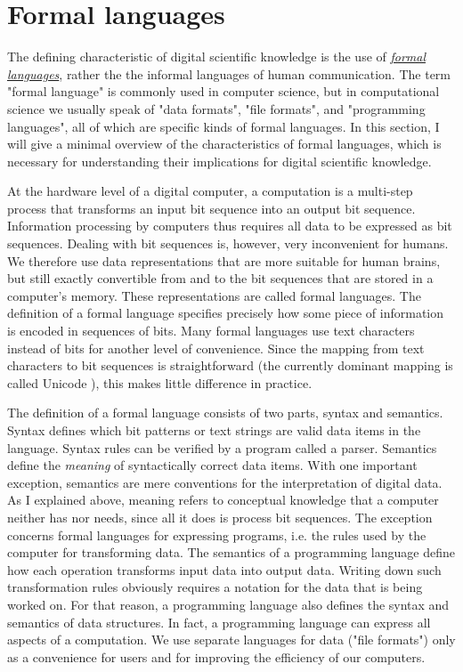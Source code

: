 \section{Formal languages}
\label{formal-languages}

The defining characteristic of digital scientific knowledge is the use of \href{http://en.wikipedia.org/wiki/Template:Formal_languages_and_grammars}{\textit{formal languages}}, rather the the informal languages of human communication. The term "formal language" is commonly used in computer science, but in computational science we usually speak of "data formats", "file formats", and "programming languages", all of which are specific kinds of formal languages. In this section, I will give a minimal overview of the characteristics of formal languages, which is necessary for understanding their implications for digital scientific knowledge.

At the hardware level of a digital computer, a computation is a multi-step process that transforms an input bit sequence into an output bit sequence. Information processing by computers thus requires all data to be expressed as bit sequences. Dealing with bit sequences is, however, very inconvenient for humans. We therefore use data representations that are more suitable for human brains, but still exactly convertible from and to the bit sequences that are stored in a computer's memory. These representations are called formal languages. The definition of a formal language specifies precisely how some piece of information is encoded in sequences of bits. Many formal languages use text characters instead of bits for another level of convenience. Since the mapping from text characters to bit sequences is straightforward (the currently dominant mapping is called Unicode \cite{_unicode_2015}), this makes little difference in practice.

The definition of a formal language consists of two parts, syntax and semantics. Syntax defines which bit patterns or text strings are valid data items in the language. Syntax rules can be verified by a program called a parser. Semantics define the \textit{meaning} of syntactically correct data items. With one important exception, semantics are mere conventions for the interpretation of digital data. As I explained above, meaning refers to conceptual knowledge that a computer neither has nor needs, since all it does is process bit sequences. The exception concerns formal languages for expressing programs, i.e. the rules used by the computer for transforming data. The semantics of a programming language define how each operation transforms input data into output data. Writing down such transformation rules obviously requires a notation for the data that is being worked on. For that reason, a programming language also defines the syntax and semantics of data structures. In fact, a programming language can express all aspects of a computation. We use separate languages for data ("file formats") only as a convenience for users and for improving the efficiency of our computers.

